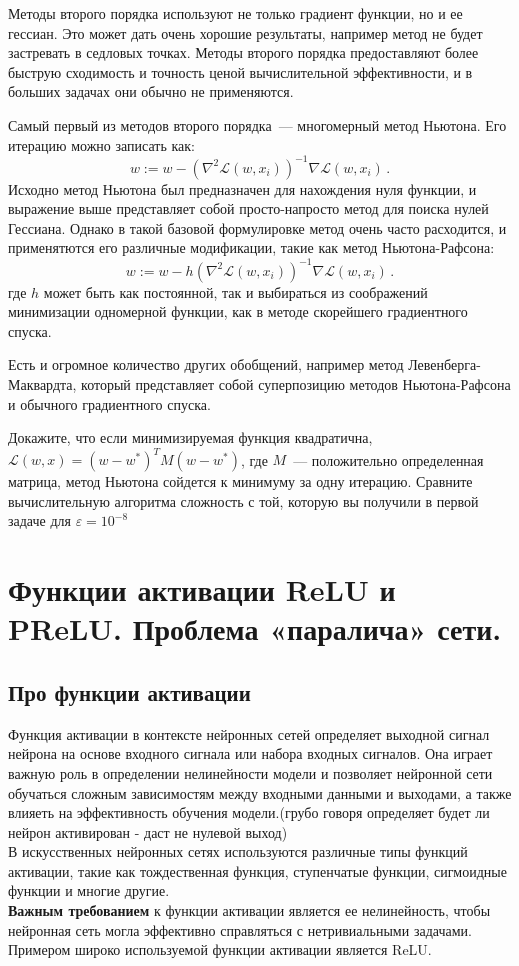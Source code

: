 Методы второго порядка используют не только градиент функции, но и ее гессиан. Это может дать очень хорошие результаты, например метод не будет застревать в седловых точках. Методы второго порядка предоставляют более быструю сходимость и точность ценой вычислительной эффективности, и в больших задачах они обычно не применяются.

Самый первый из методов второго порядка~--- многомерный метод Ньютона. Его итерацию можно записать как:
\[
	w := w - \left(\nabla^2\mathcal{L}(w, x_i)\right)^{-1}\nabla \mathcal{L}(w, x_i)\,.
\]
Исходно метод Ньютона был предназначен для нахождения нуля функции, и выражение выше представляет собой просто-напросто метод для поиска нулей Гессиана. Однако в такой базовой формулировке метод очень часто расходится, и применятются его различные модификации, такие как метод Ньютона-Рафсона:
\[
	w := w - h\left(\nabla^2\mathcal{L}(w, x_i)\right)^{-1}\nabla \mathcal{L}(w, x_i)\,.
\]
где $h$ может быть как постоянной, так и выбираться из соображений минимизации одномерной функции, как в методе скорейшего градиентного спуска.

Есть и огромное количество других обобщений, например метод Левенберга-Маквардта, который представляет собой суперпозицию методов Ньютона-Рафсона и обычного градиентного спуска.

\begin{problem}
Докажите, что если минимизируемая функция квадратична, $\mathcal{L}(w, x) = (w - w^*)^T M (w - w^*)$, где $M$~--- положительно определенная матрица, метод Ньютона сойдется к минимуму за одну итерацию. Сравните вычислительную алгоритма сложность с той, которую вы получили в первой задаче для $\varepsilon = 10^{-8}$
\end{problem}

\section{Функции активации ReLU и PReLU. Проблема «паралича» сети.}
\subsection{Про функции активации}

Функция активации в контексте нейронных сетей определяет выходной сигнал нейрона на основе входного сигнала или набора входных сигналов. Она играет важную роль в определении нелинейности модели и позволяет нейронной сети обучаться сложным зависимостям между входными данными и выходами, а также влияеть на эффективность обучения модели.(грубо говоря определяет будет ли нейрон активирован - даст не нулевой выход) \\
В искусственных нейронных сетях используются различные типы функций активации, такие как тождественная функция, ступенчатые функции, сигмоидные функции и многие другие. \\
\textbf{Важным требованием} к функции активации является ее нелинейность, чтобы нейронная сеть могла эффективно справляться с нетривиальными задачами.\\ Примером широко используемой функции активации является ReLU.

